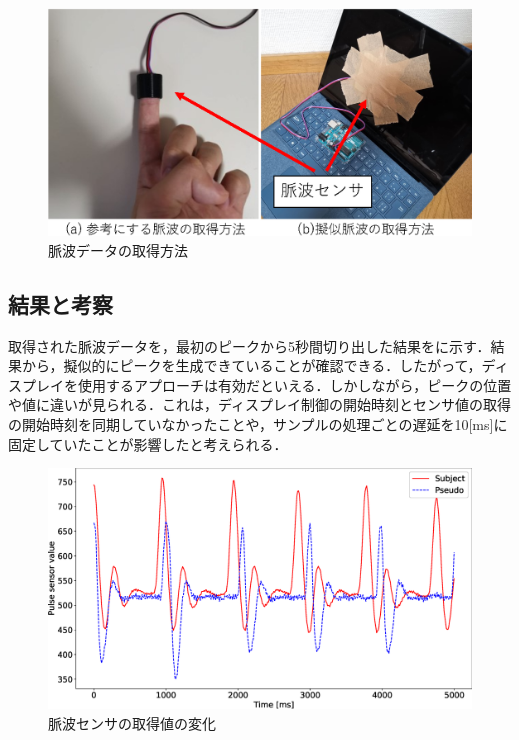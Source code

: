 \documentclass[submit,techrep]{ipsj}
\begin{document}
\begin{figure}[!h]
	\begin{center}
		\includegraphics[width=1\linewidth]{sensors.eps}
	\end{center}
	\vspace{-8mm}
	\caption{脈波データの取得方法}
	\label{fig:sensors}
\end{figure}


\subsection{結果と考察}
取得された脈波データを，最初のピークから5秒間切り出した結果をに示す．結果から，擬似的にピークを生成できていることが確認できる．したがって，ディスプレイを使用するアプローチは有効だといえる．しかしながら，ピークの位置や値に違いが見られる．これは，ディスプレイ制御の開始時刻とセンサ値の取得の開始時刻を同期していなかったことや，サンプルの処理ごとの遅延を10[ms]に固定していたことが影響したと考えられる．

\begin{figure}[!h]
	\begin{center}
		\includegraphics[width=1\linewidth]{pulse.eps}
	\end{center}
	\vspace{-8mm}
	\caption{脈波センサの取得値の変化}
	\label{fig:pulse}
\end{figure}
\end{document}
